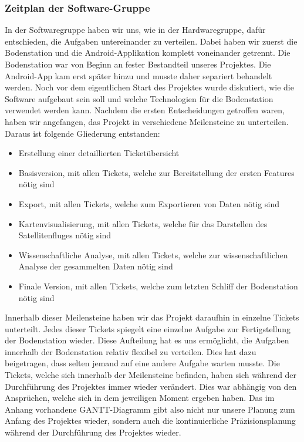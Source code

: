 \subsubsection{Zeitplan der Software-Gruppe}
In der Softwaregruppe haben wir uns, wie in der Hardwaregruppe, dafür entschieden, die Aufgaben untereinander zu verteilen. Dabei haben wir zuerst die Bodenstation und die Android-Applikation komplett voneinander getrennt. Die Bodenstation war von Beginn an fester Bestandteil unseres Projektes. Die Android-App kam erst später hinzu und musste daher separiert behandelt werden. Noch vor dem eigentlichen Start des Projektes wurde diskutiert, wie die Software aufgebaut sein soll und welche Technologien für die Bodenstation verwendet werden kann. Nachdem die ersten Entscheidungen getroffen waren, haben wir angefangen, das Projekt in verschiedene Meilensteine zu unterteilen. Daraus ist folgende Gliederung entstanden:
\begin{itemize}
    \item Erstellung einer detaillierten Ticketübersicht
    \item Basisversion, mit allen Tickets, welche zur Bereitstellung der ersten Features nötig sind
    \item Export, mit allen Tickets, welche zum Exportieren von Daten nötig sind
    \item Kartenvisualisierung, mit allen Tickets, welche für das Darstellen des Satellitenfluges nötig sind
    \item Wissenschaftliche Analyse, mit allen Tickets, welche zur wissenschaftlichen Analyse der gesammelten Daten nötig sind
    \item Finale Version, mit allen Tickets, welche zum letzten Schliff der Bodenstation nötig sind
\end{itemize}
Innerhalb dieser Meilensteine haben wir das Projekt daraufhin in einzelne Tickets unterteilt. Jedes dieser Tickets spiegelt eine einzelne Aufgabe zur Fertigstellung der Bodenstation wieder. Diese Aufteilung hat es uns ermöglicht, die Aufgaben innerhalb der Bodenstation relativ flexibel zu verteilen. Dies hat dazu beigetragen, dass selten jemand auf eine andere Aufgabe warten musste. Die Tickets, welche sich innerhalb der Meilensteine befinden, haben sich während der Durchführung des Projektes immer wieder verändert. Dies war abhängig von den Ansprüchen, welche sich in dem jeweiligen Moment ergeben haben. Das im Anhang vorhandene GANTT-Diagramm gibt also nicht nur unsere Planung zum Anfang des Projektes wieder, sondern auch die kontinuierliche Präzisionsplanung während der Durchführung des Projektes wieder.

